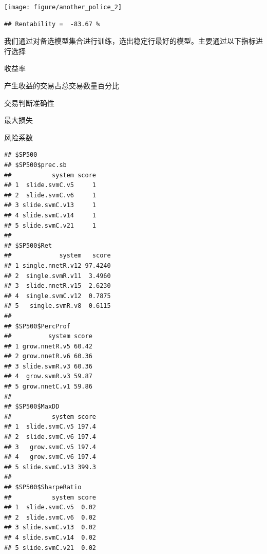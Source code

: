 \documentclass{article}\usepackage[]{graphicx}\usepackage[]{color}
\makeatletter
\newenvironment{kframe}{%
 \def\at@end@of@kframe{}%
 \ifinner\ifhmode%
  \def\at@end@of@kframe{\end{minipage}}%
  \begin{minipage}{\columnwidth}%
 \fi\fi%
 \def\FrameCommand##1{\hskip\@totalleftmargin \hskip-\fboxsep
 \colorbox{shadecolor}{##1}\hskip-\fboxsep
     \hskip-\linewidth \hskip-\@totalleftmargin \hskip\columnwidth}%
 \MakeFramed {\advance\hsize-\width
   \@totalleftmargin\z@ \linewidth\hsize
   \@setminipage}}%
 {\par\unskip\endMakeFramed%
 \at@end@of@kframe}
\newenvironment{knitrout}{}{} %
\makeatother
\begin{document}
\begin{CJK*}{UTF8}{gkai}
\begin{knitrout}
{\centering \texttt{[image: figure/another\_police\_2]} 

}


\begin{kframe}\begin{verbatim}
## Rentability =  -83.67 %
\end{verbatim}
\end{kframe}
\end{knitrout}





我们通过对备选模型集合进行训练，选出稳定行最好的模型。主要通过以下指标进行选择

\textbullet 收益率

\textbullet 产生收益的交易占总交易数量百分比

\textbullet 交易判断准确性

\textbullet 最大损失

\textbullet 风险系数

\begin{knitrout}
\color{fgcolor}\begin{kframe}
\begin{verbatim}
## $SP500
## $SP500$prec.sb
##           system score
## 1  slide.svmC.v5     1
## 2  slide.svmC.v6     1
## 3 slide.svmC.v13     1
## 4 slide.svmC.v14     1
## 5 slide.svmC.v21     1
## 
## $SP500$Ret
##             system   score
## 1 single.nnetR.v12 97.4240
## 2  single.svmR.v11  3.4960
## 3  slide.nnetR.v15  2.6230
## 4  single.svmC.v12  0.7875
## 5   single.svmR.v8  0.6115
## 
## $SP500$PercProf
##          system score
## 1 grow.nnetR.v5 60.42
## 2 grow.nnetR.v6 60.36
## 3 slide.svmR.v3 60.36
## 4  grow.svmR.v3 59.87
## 5 grow.nnetC.v1 59.86
## 
## $SP500$MaxDD
##           system score
## 1  slide.svmC.v5 197.4
## 2  slide.svmC.v6 197.4
## 3   grow.svmC.v5 197.4
## 4   grow.svmC.v6 197.4
## 5 slide.svmC.v13 399.3
## 
## $SP500$SharpeRatio
##           system score
## 1  slide.svmC.v5  0.02
## 2  slide.svmC.v6  0.02
## 3 slide.svmC.v13  0.02
## 4 slide.svmC.v14  0.02
## 5 slide.svmC.v21  0.02
\end{verbatim}
\end{kframe}
\end{knitrout}


\end{CJK*}
\end{document}
